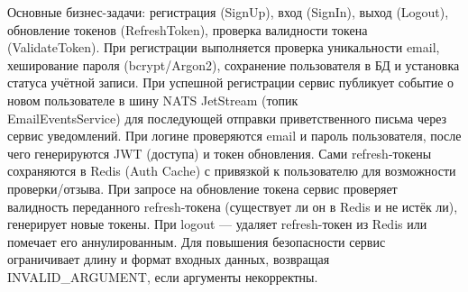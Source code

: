 Основные бизнес-задачи: регистрация (SignUp), вход (SignIn), выход (Logout), обновление токенов (RefreshToken), проверка валидности токена (ValidateToken). При регистрации выполняется проверка уникальности email, хеширование пароля (bcrypt/Argon2), сохранение пользователя в БД и установка статуса учётной записи. При успешной регистрации сервис публикует событие о новом пользователе в шину NATS JetStream (топик \\ EmailEventsService) для последующей отправки приветственного письма через сервис уведомлений. При логине проверяются email и пароль пользователя, после чего генерируются JWT (доступа) и токен обновления. Сами refresh-токены сохраняются в Redis (Auth Cache) с привязкой к пользователю для возможности проверки/отзыва. При запросе на обновление токена сервис проверяет валидность переданного refresh-токена (существует ли он в Redis и не истёк ли), генерирует новые токены. При logout — удаляет refresh-токен из Redis или помечает его аннулированным. Для повышения безопасности сервис ограничивает длину и формат входных данных, возвращая INVALID\_ARGUMENT, если аргументы некорректны.

